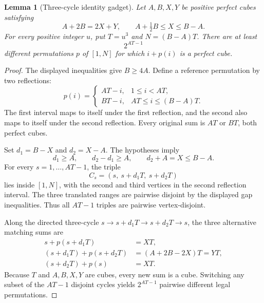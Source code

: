 \documentclass[10pt]{article}
\newtheorem{lemma}{Lemma}
\begin{document}
\begin{lemma}[Three-cycle identity gadget]
\label{lem:three-cycle}
Let $A,B,X,Y$ be positive perfect cubes satisfying
\[
A+2B=2X+Y,\qquad
A+\tfrac12B\le X\le B-A.
\]
For every positive integer $u$, put $T=u^3$
and $N=(B-A)T$. There are at least
\[
\boxed{2^{AT-1}}
\]
different permutations $p$ of $[1,N]$ for which
$i+p(i)$ is a perfect cube.
\end{lemma}
\begin{proof}
The displayed inequalities give $B\ge4A$.
Define a reference permutation by two reflections:
\[
p(i)=
\begin{cases}
AT-i,&1\le i<AT,\\
BT-i,&AT\le i\le (B-A)T.
\end{cases}
\]
The first interval maps to itself under the
first reflection, and the second also maps to
itself under the second reflection.
Every original sum is $AT$ or $BT$,
both perfect cubes.

Set $d_1=B-X$ and $d_2=X-A$.
The hypotheses imply
\[
d_1\ge A,\qquad
d_2-d_1\ge A,\qquad
d_2+A=X\le B-A.
\]
For every $s=1,\ldots,AT-1$, the triple
\[
C_s=(s,\ s+d_1T,\ s+d_2T)
\]
lies inside $[1,N]$, with the second
and third vertices in the second reflection
interval. The three translated ranges are
pairwise disjoint by the displayed gap
inequalities. Thus all $AT-1$ triples are
pairwise vertex-disjoint.

Along the directed three-cycle
$s\to s+d_1T\to s+d_2T\to s$,
the three alternative matching sums are
\[
\begin{aligned}
s+p(s+d_1T)&=XT,\\
(s+d_1T)+p(s+d_2T)&=(A+2B-2X)T=YT,\\
(s+d_2T)+p(s)&=XT.
\end{aligned}
\]
Because $T$ and $A,B,X,Y$ are cubes,
every new sum is a cube. Switching
any subset of the $AT-1$ disjoint
cycles yields $2^{AT-1}$ pairwise
different legal permutations.
\end{proof}
\end{document}
